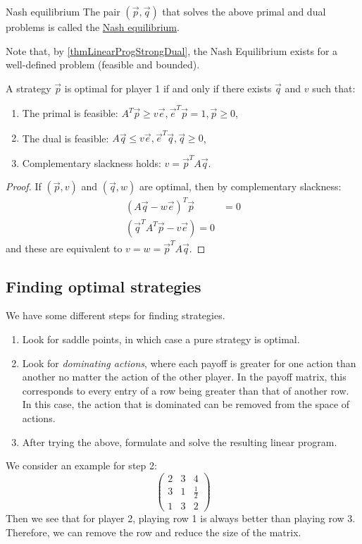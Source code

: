 \documentclass[../Main.tex]{subfiles}
\begin{document}
\begin{definition}{Nash equilibrium}
    The pair $(\vec{p}, \vec{q})$ that solves the above primal and dual problems is called the \underline{Nash equilibrium}.
\end{definition}

Note that, by \ref{thmLinearProgStrongDual}, the Nash Equilibrium exists for a well-defined problem (feasible and bounded).

\begin{theorem}
    A strategy $\vec{p}$ is optimal for player 1 if and only if there exists $\vec{q}$ and $v$ such that:
    \begin{enumerate}
        \item The primal is feasible: $A^T\vec{p} \geq v\vec{e}, \vec{e}^T \vec{p} = 1, \vec{p} \geq 0$,
        \item The dual is feasible: $A\vec{q} \leq v\vec{e}, \vec{e}^T\vec{q}, \vec{q} \geq 0$,
        \item Complementary slackness holds: $v = \vec{p}^T A \vec{q}$.
    \end{enumerate}
\end{theorem}
\begin{proof}
    If $(\vec{p}, v)$ and $(\vec{q}, w)$ are optimal, then by complementary slackness:
    \begin{align*}
        (A\vec{q} - w\vec{e})^T \vec{p} &= 0 \\
        (\vec{q}^T A^T\vec{p} - v\vec{e}) = 0
    \end{align*}
    and these are equivalent to $v = w = \vec{p}^T A \vec{q}$.
\end{proof}
\subsection{Finding optimal strategies}
We have some different steps for finding strategies.
\begin{enumerate}
    \item Look for saddle points, in which case a pure strategy is optimal.
    \item Look for \textit{dominating actions}, where each payoff is greater for one action than another no matter the action of the other player. In the payoff matrix, this corresponds to every entry of a row being greater than that of another row. In this case, the action that is dominated can be removed from the space of actions.
    \item After trying the above, formulate and solve the resulting linear program. 
\end{enumerate}
We consider an example for step 2:
\begin{equation*}
    \begin{pmatrix}
        2 & 3 & 4 \\
        3 & 1 & \frac{1}{2} \\
        1 & 3 & 2
    \end{pmatrix}
\end{equation*}
Then we see that for player 2, playing row 1 is always better than playing row 3. Therefore, we can remove the row and reduce the size of the matrix.
\end{document}
